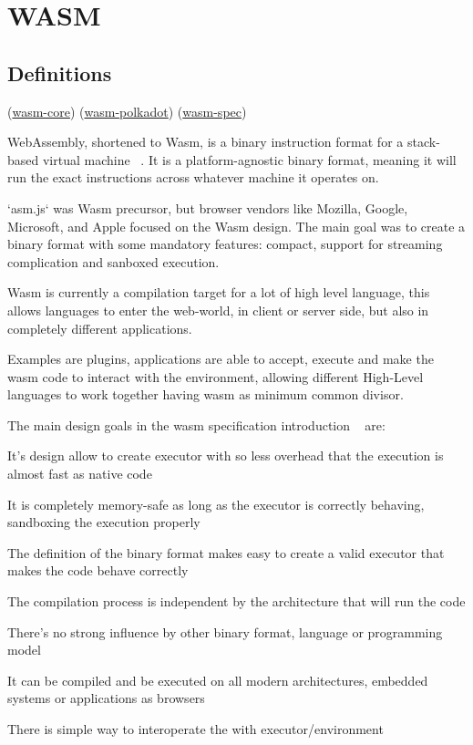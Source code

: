 \documentclass[../main.tex]{subfiles}
\begin{document}
\section{WASM}
\subsection{Definitions}
(\href{https://webassembly.github.io/spec/core/}{wasm-core})
(\href{}{wasm-polkadot})
(\href{https://www.ngzhian.com/relaxed-simd/core/_download/WebAssembly.pdf}{wasm-spec})

WebAssembly, shortened to Wasm, is a binary instruction format for a stack-based virtual machine ~\cite{wasm-core-spec}. It is a platform-agnostic binary format, meaning it will run the exact instructions across whatever machine it operates on. ~\cite{wasm-polkadot-wiki}

`asm.js` was Wasm precursor, but browser vendors like Mozilla, Google, Microsoft, and Apple focused on the Wasm design. The main goal was to create a binary format with some mandatory features: compact, support for streaming complication and sanboxed execution.

Wasm is currently a compilation target for a lot of high level language, this allows languages to enter the web-world, in client or server side, but also in completely different applications.

Examples are plugins, applications are able to accept, execute and make the wasm code to interact with the environment, allowing different High-Level languages to work together having wasm as minimum common divisor.

The main design goals in the wasm specification introduction ~\cite{wasm-core-spec} are:
\begin{description}[font=$\bullet$ \scshape\bfseries]
  \item[Fast] It's design allow to create executor with so less overhead that the execution is almost fast as native code
  \item[Safe] It is completely memory-safe as long as the executor is correctly behaving, sandboxing the execution properly
  \item[Well-defined] The definition of the binary format makes easy to create a valid executor that makes the code behave correctly
  \item[Hardware-independent] The compilation process is independent by the architecture that will run the code
  \item[Language-independent] There's no strong influence by other binary format, language or programming model
  \item[Platform-independent] It can be compiled and be executed on all modern architectures, embedded systems or applications as browsers
  \item[Open] There is simple way to interoperate the with executor/environment
\end{description}
\end{document}
